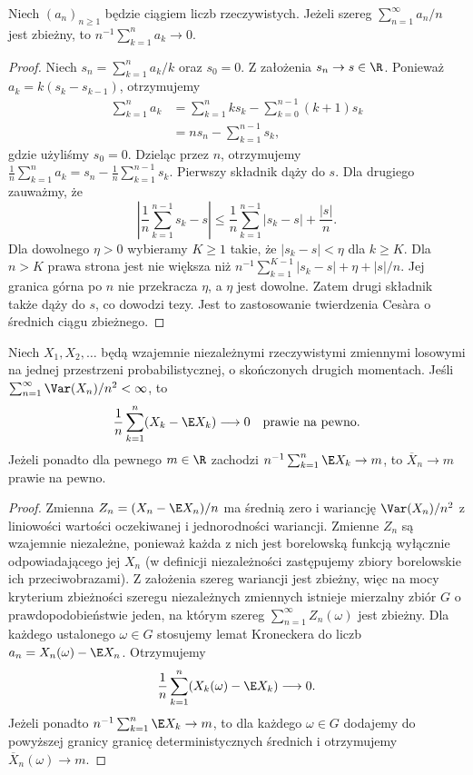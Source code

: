 \begin{lemat}
Niech $(a_n)_{n\geq1}$ będzie ciągiem liczb rzeczywistych.
Jeżeli szereg $\sum_{n=1}^\infty a_n/n$ jest zbieżny,
to $n^{-1}\sum_{k=1}^n a_k\to0$.
\end{lemat}
\begin{proof}
Niech $s_n=\sum_{k=1}^n a_k/k$ oraz $s_0=0$.
Z założenia $s_n\to s\in\R$.
Ponieważ $a_k=k(s_k-s_{k-1})$, otrzymujemy
\[
\begin{aligned}
\sum_{k=1}^n a_k
&=\sum_{k=1}^n k s_k-\sum_{k=0}^{n-1}(k+1)s_k\\
&=n s_n-\sum_{k=1}^{n-1}s_k,
\end{aligned}
\]
gdzie użyliśmy $s_0=0$.
Dzieląc przez $n$, otrzymujemy
$\frac1n\sum_{k=1}^n a_k
=s_n-\frac1n\sum_{k=1}^{n-1}s_k$.
Pierwszy składnik dąży do $s$. Dla drugiego zauważmy,
że
\[
\left|\frac1n\sum_{k=1}^{n-1}s_k-s\right|
\leq\frac1n\sum_{k=1}^{n-1}|s_k-s|+\frac{|s|}{n}.
\]
Dla dowolnego $\eta>0$ wybieramy $K\geq1$ takie,
że $|s_k-s|<\eta$ dla $k\geq K$.
Dla $n>K$ prawa strona jest nie większa niż
$n^{-1}\sum_{k=1}^{K-1}|s_k-s|+\eta+|s|/n$.
Jej granica górna po $n$ nie przekracza $\eta$,
a $\eta$ jest dowolne. Zatem drugi składnik także
dąży do $s$, co dowodzi tezy. Jest to zastosowanie
twierdzenia Cesàra o średnich ciągu zbieżnego.
\end{proof}

\begin{twierdzenie}
Niech $X_1,X_2,\ldots$ będą wzajemnie niezależnymi
rzeczywistymi zmiennymi losowymi na jednej przestrzeni
probabilistycznej, o skończonych drugich momentach.
Jeśli
$\sum_{n=1}^\infty\Var(X_n)/n^2<\infty$,
to
\[
\frac1n\sum_{k=1}^n(X_k-\E X_k)\longrightarrow0
\quad\text{prawie na pewno}.
\]
Jeżeli ponadto dla pewnego $m\in\R$ zachodzi
$n^{-1}\sum_{k=1}^n\E X_k\to m$,
to $\overline X_n\to m$ prawie na pewno.
\end{twierdzenie}
\begin{proof}
Zmienna $Z_n=(X_n-\E X_n)/n$ ma średnią zero
i wariancję $\Var(X_n)/n^2$ z liniowości wartości
oczekiwanej i jednorodności wariancji.
Zmienne $Z_n$ są wzajemnie niezależne, ponieważ
każda z nich jest borelowską funkcją wyłącznie
odpowiadającego jej $X_n$ (w definicji niezależności
zastępujemy zbiory borelowskie ich przeciwobrazami).
Z założenia szereg wariancji jest zbieżny, więc na
mocy kryterium zbieżności szeregu niezależnych zmiennych
istnieje mierzalny zbiór $G$ o prawdopodobieństwie
jeden, na którym szereg $\sum_{n=1}^\infty Z_n(\omega)$
jest zbieżny. Dla każdego ustalonego $\omega\in G$
stosujemy lemat Kroneckera do liczb
$a_n=X_n(\omega)-\E X_n$. Otrzymujemy
\[
\frac1n\sum_{k=1}^n(X_k(\omega)-\E X_k)\longrightarrow0.
\]
Jeżeli ponadto $n^{-1}\sum_{k=1}^n\E X_k\to m$, to
dla każdego $\omega\in G$ dodajemy do powyższej
granicy granicę deterministycznych średnich i otrzymujemy
$\overline X_n(\omega)\to m$.
\end{proof}

